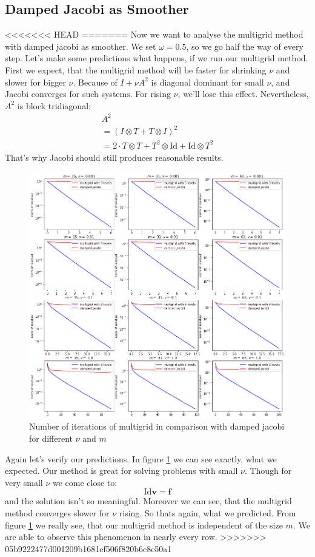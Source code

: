 \documentclass{amsart}
\theoremstyle{definition}
\theoremstyle{remark}
\numberwithin{equation}{section}
\newcommand{\Id}{\mathrm{Id}}
\renewcommand{\vec}{\textbf}
\begin{document}
\subsection{Damped Jacobi as Smoother}
<<<<<<< HEAD
\hfill
=======
Now we want to analyse the multigrid method with damped jacobi as smoother. We set $\omega= 0.5$, so we go half the way of every step. Let's make some predictions what happens, if we run our multigrid method. First we expect, that the multigrid method will be faster for shrinking $\nu$ and slower for bigger $\nu$. Because of $I + \nu A^2$ is diagonal dominant for small $\nu$, and Jacobi converges for such systems. For rising $\nu$, we'll lose this effect. Nevertheless, $A^2$ is block tridiagonal:
\begin{align*}
A^2\\
= (I \otimes T + T \otimes I)^2 \\
= 2  \cdot T \otimes T + T^2 \otimes \Id + \Id \otimes T^2 
\end{align*}
That's why Jacobi should still produces reasonable results. 
\begin{figure}[h!]
	\centering
	\includegraphics[scale=0.4]{./imgs/multigrid_jac_comparison_tiny}
	\caption{Number of iterations of multigrid in comparison with damped jacobi for different $\nu$ and $m$}
	\label{fig: multigridJacobi}
\end{figure}

Again let's verify our predictions. In figure \ref{fig: multigridJacobi} we can see exactly, what we expected. Our method is great for solving problems with small $\nu$. Though for very small $\nu$ we come close to:
\[
\Id   \vec{v} = \vec{f}
\] 
and the solution isn't so meaningful.
Moreover we can see, that the multigrid method converges slower for $\nu$ rising. So thats again, what we predicted. From figure \ref*{fig: multigridJacobi} we really see, that our multigrid method is independent of the size $m$. We are able to observe this phenomenon in nearly every row. 
>>>>>>> 05b9222477d001209b1681ef506f820b6c8e50a1
\end{document}

